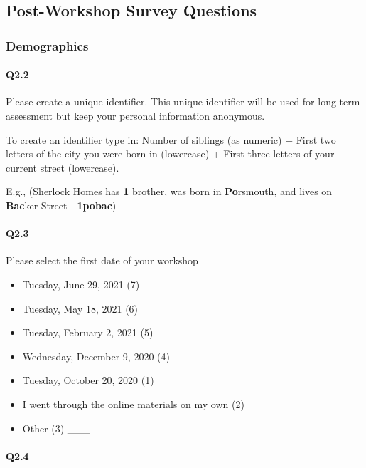 \documentclass[030-workshop.tex]{subfiles}
\begin{document}
\subsection{Post-Workshop Survey Questions}
\label{sse:postworkshop-survey-questions}

\subsubsection{Demographics}

    \paragraph{Q2.2}

        Please create a unique identifier.
        This unique identifier will be used for long-term assessment but keep your personal information anonymous.

        To create an identifier type in:
        Number of siblings (as numeric) +
        First two letters of the city you were born in (lowercase) +
        First three letters of your current street (lowercase).

        E.g., (Sherlock Homes has \textbf{1} brother,
            was born in \textbf{Po}rsmouth,
            and lives on \textbf{Bac}ker Street - \textbf{1pobac})

    \paragraph{Q2.3}

        Please select the first date of your workshop

        \begin{itemize}
            \item Tuesday, June 29, 2021  (7)
            \item Tuesday, May 18, 2021  (6)
            \item Tuesday, February 2, 2021  (5)
            \item Wednesday, December 9, 2020  (4)
            \item Tuesday, October 20, 2020  (1)
            \item I went through the online materials on my own  (2)
            \item Other  (3) \_\_\_
        \end{itemize}

    \paragraph{Q2.4}
\end{document}
